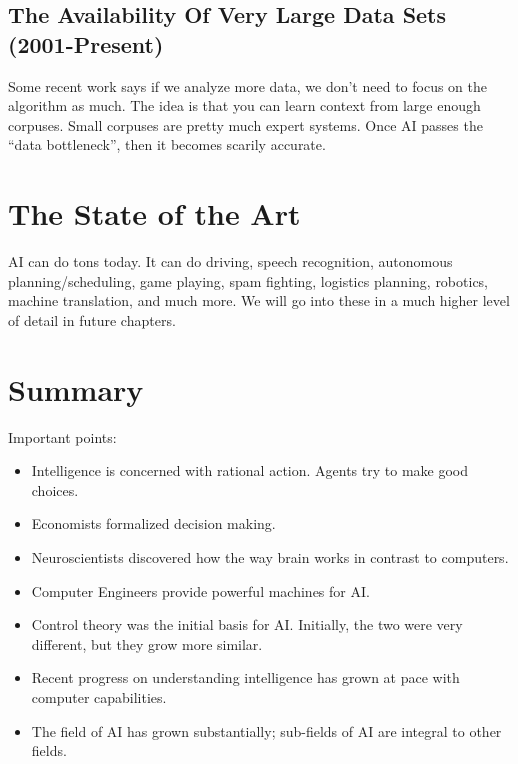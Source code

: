 
\subsection{The Availability Of Very Large Data Sets (2001-Present)} %
\label{sub:the_availability_of_very_large_data_sets_}

Some recent work says if we analyze more data, we don't need to focus on the
algorithm as much.
The idea is that you can learn context from large enough corpuses.
Small corpuses are pretty much expert systems.
Once AI passes the ``data bottleneck'', then it becomes scarily accurate.



\section{The State of the Art} %
\label{sec:the_state_of_the_art}

AI can do tons today.
It can do driving, speech recognition, autonomous planning/scheduling, game
playing, spam fighting, logistics planning, robotics, machine translation, and
much more.
We will go into these in a much higher level of detail in future chapters.


\section{Summary} %
\label{sec:summary}
Important points:
\begin{itemize}
    \item Intelligence is concerned with rational action.
    Agents try to make good choices.
    \item Economists formalized decision making.
    \item Neuroscientists discovered how the way brain works in contrast to
    computers.
    \item Computer Engineers provide powerful machines for AI.
    \item Control theory was the initial basis for AI.
    Initially, the two were very different, but they grow more similar.
    \item Recent progress on understanding intelligence has grown at pace with
    computer capabilities.
    \item The field of AI has grown substantially;
    sub-fields of AI are integral to other fields.
\end{itemize}

